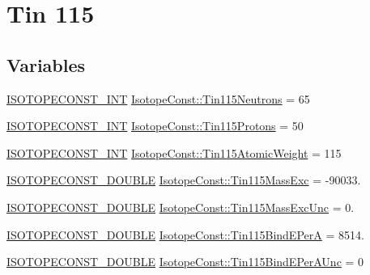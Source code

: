 \hypertarget{group___isotope_const-_tin-_sn115}{}\section{Tin 115}
\label{group___isotope_const-_tin-_sn115}
\subsection*{Variables}
\begin{DoxyCompactItemize}
\item 
\mbox{\hyperlink{group___isotope_const-_macros_ga5f18360b3e99483a35c32d789e62621c}{I\+S\+O\+T\+O\+P\+E\+C\+O\+N\+S\+T\+\_\+\+I\+NT}} \mbox{\hyperlink{group___isotope_const-_tin-_sn115_ga76ab11c19c65a3241ca15459eb73e7bf}{Isotope\+Const\+::\+Tin115\+Neutrons}} = 65
\item 
\mbox{\hyperlink{group___isotope_const-_macros_ga5f18360b3e99483a35c32d789e62621c}{I\+S\+O\+T\+O\+P\+E\+C\+O\+N\+S\+T\+\_\+\+I\+NT}} \mbox{\hyperlink{group___isotope_const-_tin-_sn115_ga4450e975ad70068bf354b45d229708f5}{Isotope\+Const\+::\+Tin115\+Protons}} = 50
\item 
\mbox{\hyperlink{group___isotope_const-_macros_ga5f18360b3e99483a35c32d789e62621c}{I\+S\+O\+T\+O\+P\+E\+C\+O\+N\+S\+T\+\_\+\+I\+NT}} \mbox{\hyperlink{group___isotope_const-_tin-_sn115_ga613de319313fdd30905c50dfca1e9b10}{Isotope\+Const\+::\+Tin115\+Atomic\+Weight}} = 115
\item 
\mbox{\hyperlink{group___isotope_const-_macros_ga8f45a7272ce02c0b4c65c44636ed719a}{I\+S\+O\+T\+O\+P\+E\+C\+O\+N\+S\+T\+\_\+\+D\+O\+U\+B\+LE}} \mbox{\hyperlink{group___isotope_const-_tin-_sn115_ga206ec61bdd55636773acbd8f623bc76c}{Isotope\+Const\+::\+Tin115\+Mass\+Exc}} = -\/90033.
\item 
\mbox{\hyperlink{group___isotope_const-_macros_ga8f45a7272ce02c0b4c65c44636ed719a}{I\+S\+O\+T\+O\+P\+E\+C\+O\+N\+S\+T\+\_\+\+D\+O\+U\+B\+LE}} \mbox{\hyperlink{group___isotope_const-_tin-_sn115_gaaeac9c75e7a2e81666f04f163246a56b}{Isotope\+Const\+::\+Tin115\+Mass\+Exc\+Unc}} = 0.
\item 
\mbox{\hyperlink{group___isotope_const-_macros_ga8f45a7272ce02c0b4c65c44636ed719a}{I\+S\+O\+T\+O\+P\+E\+C\+O\+N\+S\+T\+\_\+\+D\+O\+U\+B\+LE}} \mbox{\hyperlink{group___isotope_const-_tin-_sn115_gacfdd68e98f9e9406206885022d818bfa}{Isotope\+Const\+::\+Tin115\+Bind\+E\+PerA}} = 8514.
\item 
\mbox{\hyperlink{group___isotope_const-_macros_ga8f45a7272ce02c0b4c65c44636ed719a}{I\+S\+O\+T\+O\+P\+E\+C\+O\+N\+S\+T\+\_\+\+D\+O\+U\+B\+LE}} \mbox{\hyperlink{group___isotope_const-_tin-_sn115_ga9dbe8d6716424cd8e1ae330cb2850261}{Isotope\+Const\+::\+Tin115\+Bind\+E\+Per\+A\+Unc}} = 0

\end{DoxyCompactItemize}
